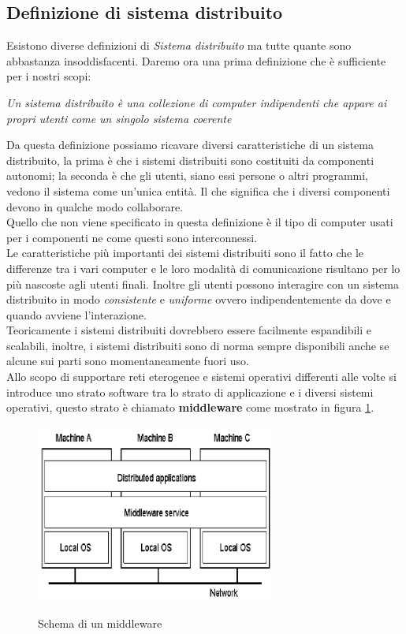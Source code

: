 \subsection{Definizione di sistema distribuito}
Esistono diverse definizioni di \emph{Sistema distribuito} ma tutte quante sono abbastanza insoddisfacenti. Daremo ora una prima definizione che è sufficiente per i nostri scopi:
\begin{center}
\emph{Un sistema distribuito è una collezione di computer indipendenti che appare ai propri utenti come un singolo sistema coerente}
\end{center}
Da questa definizione possiamo ricavare diversi caratteristiche di un sistema distribuito, la prima è che i sistemi distribuiti sono costituiti da componenti autonomi; la seconda è che gli utenti, siano essi persone o altri programmi, vedono il sistema come un'unica entità. Il che significa che i diversi componenti devono in qualche modo collaborare.\\
Quello che non viene specificato in questa definizione è il tipo di computer usati per i componenti ne come questi sono interconnessi.\\
Le caratteristiche più importanti dei sistemi distribuiti sono il fatto che le differenze tra i vari computer e le loro modalità di comunicazione risultano per lo più nascoste agli utenti finali. Inoltre gli utenti possono interagire con un sistema distribuito in modo \emph{consistente} e \emph{uniforme} ovvero indipendentemente da dove e quando avviene l'interazione.\\
Teoricamente i sistemi distribuiti dovrebbero essere facilmente espandibili e scalabili, inoltre, i sistemi distribuiti sono di norma sempre disponibili anche se alcune sui parti sono momentaneamente fuori uso.\\
Allo scopo di supportare reti eterogenee e sistemi operativi differenti alle volte si introduce uno strato software tra lo strato di applicazione e i diversi sistemi operativi, questo strato è chiamato \textbf{middleware} come mostrato in figura \ref{fig:midd}.
\begin{figure}[htb]
\centering
\includegraphics[width=8cm]{img/schemamidd.png}\\
\label{fig:midd}
\caption{Schema di un middleware}
\end{figure}
